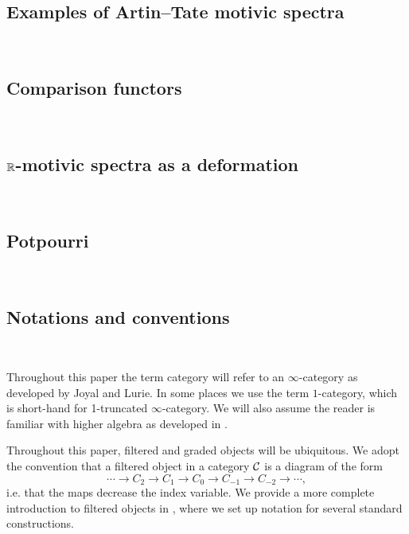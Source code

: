 

\subsection{Examples of Artin--Tate motivic spectra}\ 



\subsection{Comparison functors}\ 



\subsection{$\mathbb{R}$-motivic spectra as a deformation}\ 





\subsection{Potpourri}\



\subsection*{Notations and conventions}\ 



Throughout this paper the term category will refer to an $\infty$-category as developed by Joyal and Lurie. In some places we use the term $1$-category, which is short-hand for 1-truncated $\infty$-category. We will also assume the reader is familiar with higher algebra as developed in \cite{HA}.

Throughout this paper, filtered and graded objects will be ubiquitous.
We adopt the convention that a filtered object in a category $\mathcal{C}$ is a diagram of the form
  \[ \cdots \to C_2 \to C_1 \to C_0 \to C_{-1} \to C_{-2} \to \cdots, \]
i.e. that the maps decrease the index variable. We provide a more complete introduction to filtered objects in , where we set up notation for several standard constructions.

